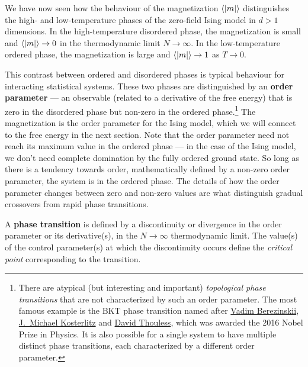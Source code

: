 We have now seen how the behaviour of the magnetization $\left\langle |m| \right\rangle$ distinguishes the high- and low-temperature phases of the zero-field Ising model in $d > 1$ dimensions.
In the high-temperature disordered phase, the magnetization is small and $\left\langle |m| \right\rangle \to 0$ in the thermodynamic limit $N \to \infty$.
In the low-temperature ordered phase, the magnetization is large and $\left\langle |m| \right\rangle \to 1$ as $T \to 0$.

This contrast between ordered and disordered phases is typical behaviour for interacting statistical systems.
These two phases are distinguished by an \textbf{order parameter} --- an observable (related to a derivative of the free energy) that is zero in the disordered phase but non-zero in the ordered phase.\footnote{There are atypical (but interesting and important) \textit{topological phase transitions} that are not characterized by such an order parameter.  The most famous example is the BKT phase transition named after \href{https://en.wikipedia.org/wiki/Vadim_Berezinskii}{Vadim Berezinskii}, \href{https://en.wikipedia.org/wiki/J._Michael_Kosterlitz}{J.\ Michael Kosterlitz} and \href{https://en.wikipedia.org/wiki/David_J._Thouless}{David Thouless}, which was awarded the 2016 Nobel Prize in Physics.  It is also possible for a single system to have multiple distinct phase transitions, each characterized by a different order parameter.}
The magnetization is the order parameter for the Ising model, which we will connect to the free energy in the next section.
Note that the order parameter need not reach its maximum value in the ordered phase --- in the case of the Ising model, we don't need complete domination by the fully ordered ground state.
So long as there is a tendency towards order, mathematically defined by a non-zero order parameter, the system is in the ordered phase.
The details of how the order parameter changes between zero and non-zero values are what distinguish gradual crossovers from rapid phase transitions.

\begin{shaded}
  A \textbf{phase transition} is defined by a discontinuity or divergence in the order parameter or its derivative(s), in the $N \to \infty$ thermodynamic limit.
  The value(s) of the control parameter(s) at which the discontinuity occurs define the \textit{critical point} corresponding to the transition.
\end{shaded}

